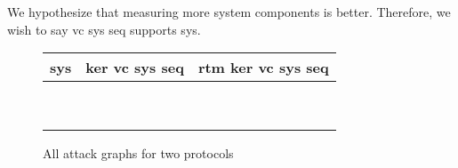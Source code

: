 We hypothesize that measuring more system components is better. Therefore, we wish to say vc sys seq supports sys. 

\begin{figure}
    \begin{center}
        \begin{tabular}{ M{3.75cm} | M{4.75cm} | M{3.75cm} }
                sys & ker vc sys seq & rtm ker vc sys seq  \\
                \hline
                \hline
                \\  &  &  \\ [50pt]
                \\  &  &   \\ [50pt]  
                 &   &  \\ [50pt]  
                \\  &  &   \\ [50pt] 
                \\  &  &   \\ [50pt] 
            \end{tabular}
        \end{center}
        \caption{All attack graphs for two protocols}
    \end{figure}